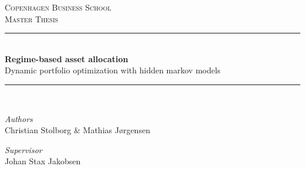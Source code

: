 

\begin{titlepage}

\newcommand{\HRule}{\rule{\linewidth}{0.5mm}} %



    


\begin{center}
    


\textsc{\Large Copenhagen Business School}\\[0.5cm] 
\textsc{\large Master Thesis}\\[0.5cm] 


\HRule \\[0.4cm]
{ \huge \bfseries Regime-based asset allocation}\\
{\Large Dynamic portfolio optimization with hidden markov models} 
\HRule \\[1.5cm]


\end{center}


\begin{center}
    \large
    \textit{Authors}\\
    Christian Stolborg \& Mathias Jørgensen
    
    \textit{Supervisor}\\
    Johan Stax Jakobsen
\end{center}

\vspace{2cm}



\end{titlepage}
